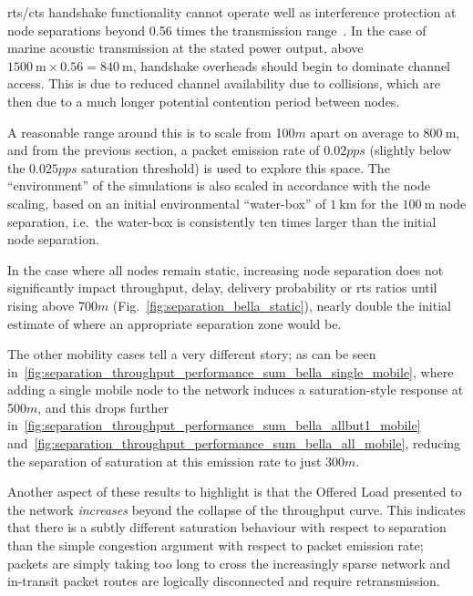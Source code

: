 \gls{rts}/\gls{cts} handshake functionality cannot operate well as interference protection at node separations beyond 0.56 times the transmission range~\cite{Xu2002}.
In the case of marine acoustic transmission at the stated power output, above $\SI{1500}{\meter} \times 0.56 = \SI{840}{\meter}$, handshake overheads should begin to dominate channel access.
This is due to reduced channel availability due to collisions, which are then due to a much longer potential contention period between nodes. 

A reasonable range around this is to scale from 100$m$ apart on average to $\SI{800}{\meter}$, and from the previous section, a packet emission rate of $0.02pps$ (slightly below the $0.025pps$ saturation threshold) is used to explore this space.
The ``environment'' of the simulations is also scaled in accordance with the node scaling, based on an initial environmental ``water-box'' of $\SI{1}{\kilo\meter}$ for the $\SI{100}{\meter}$ node separation, i.e.\ the water-box is consistently ten times larger than the initial node separation.

In the case where all nodes remain static, increasing node separation does not significantly impact throughput, delay, delivery probability or \gls{rts} ratios until rising above 700$m$ (Fig.~\ref{fig:separation_bella_static}), nearly double the initial estimate of where an appropriate separation zone would be.

The other mobility cases tell a very different story; as can be seen in~\autoref{fig:separation_throughput_performance_sum_bella_single_mobile}, where adding a single mobile node to the network induces a saturation-style response at 500$m$, and this drops further in~\autoref{fig:separation_throughput_performance_sum_bella_allbut1_mobile} and~\autoref{fig:separation_throughput_performance_sum_bella_all_mobile}, reducing the separation of saturation at this emission rate to just 300$m$.

Another aspect of these results to highlight is that the Offered Load presented to the network \emph{increases} beyond the collapse of the throughput curve. 
This indicates that there is a subtly different saturation behaviour with respect to separation than the simple congestion argument with respect to packet emission rate; packets are simply taking too long to cross the increasingly sparse network and in-transit packet routes are logically disconnected and require retransmission.



